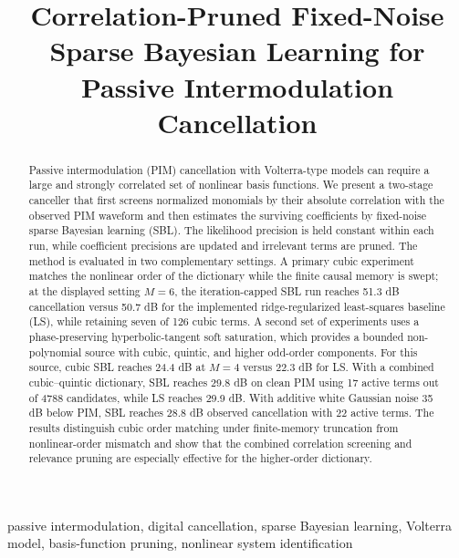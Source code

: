 \documentclass[conference]{IEEEtran}
\begin{document}

\title{Correlation-Pruned Fixed-Noise Sparse Bayesian Learning for Passive Intermodulation Cancellation}

\author{}

\maketitle

\begin{abstract}
Passive intermodulation (PIM) cancellation with Volterra-type models can require a large and strongly correlated set of nonlinear basis functions. We present a two-stage canceller that first screens normalized monomials by their absolute correlation with the observed PIM waveform and then estimates the surviving coefficients by fixed-noise sparse Bayesian learning (SBL). The likelihood precision is held constant within each run, while coefficient precisions are updated and irrelevant terms are pruned. The method is evaluated in two complementary settings. A primary cubic experiment matches the nonlinear order of the dictionary while the finite causal memory is swept; at the displayed setting $M=6$, the iteration-capped SBL run reaches 51.3 dB cancellation versus 50.7 dB for the implemented ridge-regularized least-squares baseline (LS), while retaining seven of 126 cubic terms. A second set of experiments uses a phase-preserving hyperbolic-tangent soft saturation, which provides a bounded non-polynomial source with cubic, quintic, and higher odd-order components. For this source, cubic SBL reaches 24.4 dB at $M=4$ versus 22.3 dB for LS. With a combined cubic--quintic dictionary, SBL reaches 29.8 dB on clean PIM using 17 active terms out of 4788 candidates, while LS reaches 29.9 dB. With additive white Gaussian noise 35 dB below PIM, SBL reaches 28.8 dB observed cancellation with 22 active terms. The results distinguish cubic order matching under finite-memory truncation from nonlinear-order mismatch and show that the combined correlation screening and relevance pruning are especially effective for the higher-order dictionary.
\end{abstract}

\begin{IEEEkeywords}
passive intermodulation, digital cancellation, sparse Bayesian learning, Volterra model, basis-function pruning, nonlinear system identification
\end{IEEEkeywords}
\end{document}
